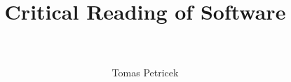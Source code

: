 \documentclass[fleqn,11pt]{report}
\begin{document}
\title{\Huge \textbf{Critical Reading of Software}\\~\\}
\author{Tomas Petricek}
\maketitle


\end{document}
